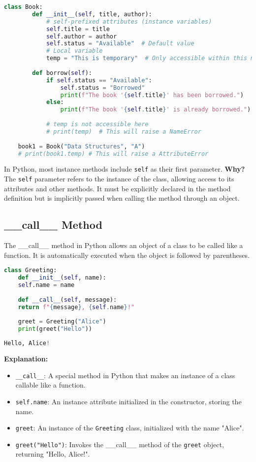 \begin{lstlisting}[language=python]
	class Book:
		def __init__(self, title, author):
			# self-prefixed attributes (instance variables)
			self.title = title
			self.author = author
			self.status = "Available"  # Default value
			# Local variable
			temp = "This is temporary"  # Only accessible within this method
			
		def borrow(self):
			if self.status == "Available":
				self.status = "Borrowed"
				print(f"The book '{self.title}' has been borrowed.")
			else:
				print(f"The book '{self.title}' is already borrowed.")
		
			# temp is not accessible here
			# print(temp)  # This will raise a NameError
	
	book1 = Book("Data Structures", "A")
	# print(book1.temp) # This will raise a AttributeError
\end{lstlisting}
\begin{tcolorbox}[title=Note on \texttt{self}, colback=yellow!5, colframe=yellow!50!black]
	In Python, most instance methods include \texttt{self} as their first parameter.  
	\textbf{Why?}  
	The \texttt{self} parameter refers to the instance of the class, allowing access to its attributes and other methods. It must be explicitly declared in the method definition but is implicitly passed when calling the method through an object.
\end{tcolorbox}


\subsection{\_\_call\_\_ Method}
The \_\_call\_\_ method in Python allows an object of a class to be called like a function. It is automatically executed when the object is followed by parentheses.

\begin{lstlisting}[language=python, caption={\_\_call\_\_ Method}]
	class Greeting:
	def __init__(self, name):
	self.name = name
	
	def __call__(self, message):
	return f"{message}, {self.name}!"
	
	greet = Greeting("Alice")
	print(greet("Hello"))
\end{lstlisting}

\begin{lstlisting}[language=python, caption={Output \_\_call\_\_ method}]
	Hello, Alice!
\end{lstlisting}

\textbf{Explanation:}
\begin{itemize}
	\item \texttt{\_\_call\_\_}: A special method in Python that makes an instance of a class callable like a function.
	\item \texttt{self.name}: An instance attribute initialized in the constructor, storing the name.
	\item \texttt{greet}: An instance of the \texttt{Greeting} class, initialized with the name "Alice".
	\item \texttt{greet("Hello")}: Invokes the \_\_call\_\_ method of the \texttt{greet} object, returning "Hello, Alice!".
\end{itemize}

